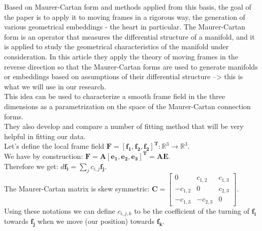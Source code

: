 Based on Maurer-Cartan form and methods applied from this basis, the goal of the paper is to apply it to moving frames in a rigorous way, the generation of various geometrical embeddings - the heart in particular. The Maurer-Cartan form is an operator that measures the differential structure of a manifold, and it is applied to study the geometrical characteristics  of the manifold under consideration. In this article they apply the theory of moving frames in the reverse direction so that the Maurer-Cartan forms are used to generate manifolds or embeddings based on assumptions of their differential structure --> this is what we will use in our research.\\
This idea can be used to characterize a smooth frame field in the three dimensions as a parametrization on the space of the Maurer-Cartan connection forms.\\
They also develop and compare a number of fitting method that will be very helpful in fitting our data.\\
Let's define the local frame field $\mathbf{F = [f_1 , f_2 , f_2]^T} : \mathbb{R}^3 \to \mathbb{R}^3$.\\
We have by construction: $\mathbf{F = A[e_1 , e_2 , e_3]^T = AE}$.\\
Therefore we get: $d \mathbf{f_i} = \sum_j c_{i,j}\mathbf{f_j}$.\\
The Maurer-Cartan matrix is skew symmetric: $\mathbf{C} = \begin{bmatrix}0 & c_{1,2} & c_{1,3} \\ -c_{1,2} & 0 & c_{2,3} \\ -c_{1,3} & -c_{2,3} & 0
\end{bmatrix}$.\\
Using these notations we can define $c_{i,j,k}$ to be the coefficient of the turning of $\mathbf{f_i}$ towards $\mathbf{f_j}$ when we move (our position) towards $\mathbf{f_k}$.